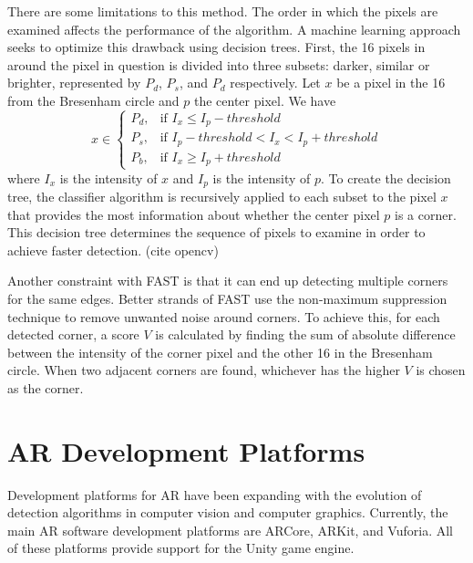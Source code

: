 There are some limitations to this method. The order in which the pixels are examined affects the performance of the algorithm. A machine learning approach seeks to optimize this drawback using decision trees. First, the 16 pixels in around the pixel in question is divided into three subsets: darker, similar or brighter, represented by $P_d$, $P_s$, and $P_d$ respectively. Let $x$ be a pixel in the 16 from the Bresenham circle and $p$ the center pixel. We have
\begin{equation}
x \in \begin{cases}
	P_d, & \text{if $I_x \leq I_p - threshold$} \\
	P_s, & \text{if $I_p - threshold < I_x < I_p + threshold$} \\
	P_b, & \text{if $I_x \geq I_p + threshold$}
	\end{cases}
\end{equation}
where $I_x$ is the intensity of $x$ and $I_p$ is the intensity of $p$. To create the decision tree, the classifier algorithm is recursively applied to each subset to the pixel $x$ that provides the most information about whether the center pixel $p$ is a corner. This decision tree determines the sequence of pixels to examine in order to achieve faster detection. (cite opencv)

Another constraint with FAST is that it can end up detecting multiple corners for the same edges. Better strands of FAST use the non-maximum suppression technique to remove unwanted noise around corners. To achieve this, for each detected corner, a score $V$ is calculated by finding the sum of absolute difference between the intensity of the corner pixel and the other 16 in the Bresenham circle. When two adjacent corners are found, whichever has the higher $V$ is chosen as the corner.

\section{AR Development Platforms}
Development platforms for AR have been expanding with the evolution of detection algorithms in computer vision and computer graphics. Currently, the main AR software development platforms are ARCore, ARKit, and Vuforia. All of these platforms provide support for the Unity game engine.


